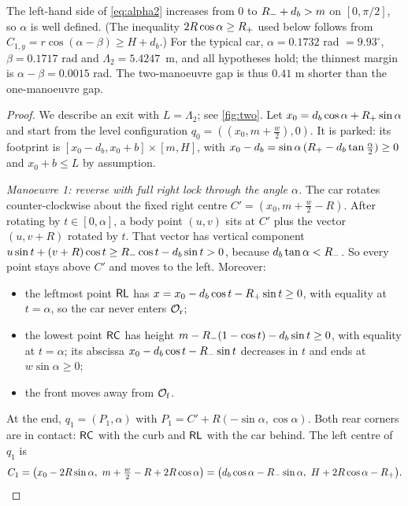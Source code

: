 The left-hand side of \eqref{eq:alpha2} increases from $0$ to $R_{-}+d_b>m$ on $[0,\pi/2]$, so $\alpha$ is well defined.
(The inequality $2R\cos\alpha\ge R_{+}$ used below follows from $C_{1,y}=r\cos(\alpha-\beta)\ge H+d_b$.)
For the typical car, $\alpha=0.1732$ rad $=9.93^\circ$, $\beta=0.1717$ rad and $\Lambda_2=5.4247$~m, and all hypotheses hold; the thinnest margin is $\alpha-\beta=0.0015$ rad.
The two-manoeuvre gap is thus $0.41$ m shorter than the one-manoeuvre gap.

\begin{proof}
We describe an exit with $L=\Lambda_2$; see \cref{fig:two}.
Let $x_0=d_b\cos\alpha+R_{+}\sin\alpha$ and start from the level configuration $q_0=((x_0,m+\tfrac w2),0)$.
It is parked: its footprint is $[x_0-d_b,x_0+b]\times[m,H]$, with $x_0-d_b=\sin\alpha\,(R_{+}-d_b\tan\frac\alpha2)\ge0$ and $x_0+b\le L$ by assumption.

\emph{Manoeuvre 1: reverse with full right lock through the angle $\alpha$.}
The car rotates counter-clockwise about the fixed right centre $C'=(x_0,m+\tfrac w2-R)$.
After rotating by $t\in[0,\alpha]$, a body point $(u,v)$ sits at $C'$ plus the vector $(u,v+R)$ rotated by $t$.
That vector has vertical component $u\sin t+(v+R)\cos t\ge R_{-}\cos t-d_b\sin t>0$, because $d_b\tan\alpha<R_{-}$.
So every point stays above $C'$ and moves to the left. Moreover:
\begin{itemize}[nosep]
\item the leftmost point $\mathsf{RL}$ has $x=x_0-d_b\cos t-R_{+}\sin t\ge0$, with equality at $t=\alpha$, so the car never enters $\mathcal{O}_{\mathrm r}$;
\item the lowest point $\mathsf{RC}$ has height $m-R_{-}(1-\cos t)-d_b\sin t\ge0$, with equality at $t=\alpha$; its abscissa $x_0-d_b\cos t-R_{-}\sin t$ decreases in $t$ and ends at $w\sin\alpha\ge0$;
\item the front moves away from $\mathcal{O}_{\mathrm f}$.
\end{itemize}
At the end, $q_1=(P_1,\alpha)$ with $P_1=C'+R(-\sin\alpha,\cos\alpha)$.
Both rear corners are in contact: $\mathsf{RC}$ with the curb and $\mathsf{RL}$ with the car behind.
The left centre of $q_1$ is
\[
  C_1=\big(x_0-2R\sin\alpha,\ m+\tfrac w2-R+2R\cos\alpha\big)=\big(d_b\cos\alpha-\Rm\sin\alpha,\ H+2R\cos\alpha-\Rp\big).
\]


\end{proof}
